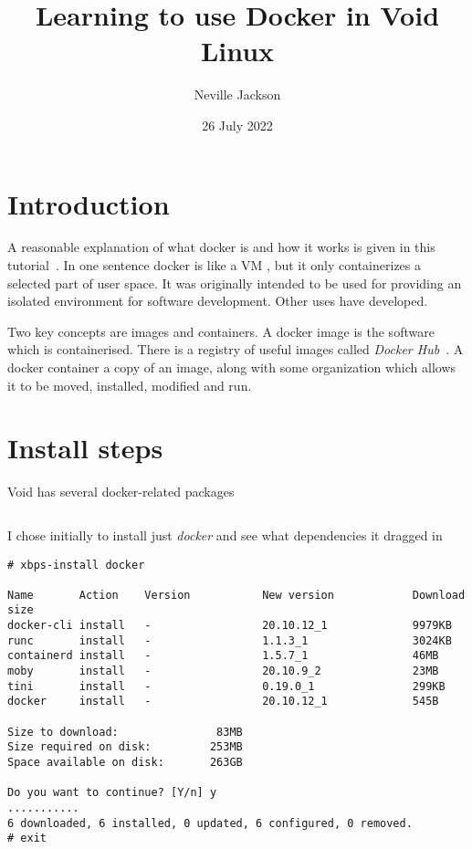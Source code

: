 \documentclass{article}  %
\title{Learning to use Docker in Void Linux}
\author{Neville Jackson}
\date{26 July 2022}
\begin{document}
 

\maketitle      

\section{Introduction} 
A reasonable explanation of what docker is and how it works is given in this tutorial~\cite{dock:00}. In one sentence docker is like a VM , but it only containerizes a selected part of user space. It was originally intended to be used for providing an isolated environment for software development. Other uses have developed. 

Two key concepts are images and containers. A docker image is the software which is containerised. There is a registry of useful images called {\em Docker Hub}~\cite{dock:02}. A docker container  a copy of an image, along with some organization which  allows it to be moved, installed, modified and run.

\section{Install steps}
\label{sec:install}
Void has several docker-related packages
\begin{verbatim}
\end{verbatim}
I chose initially to install just {\em docker} and see what dependencies it dragged in
\begin{verbatim}
# xbps-install docker

Name       Action    Version           New version            Download size
docker-cli install   -                 20.10.12_1             9979KB 
runc       install   -                 1.1.3_1                3024KB 
containerd install   -                 1.5.7_1                46MB 
moby       install   -                 20.10.9_2              23MB 
tini       install   -                 0.19.0_1               299KB 
docker     install   -                 20.10.12_1             545B 

Size to download:               83MB
Size required on disk:         253MB
Space available on disk:       263GB

Do you want to continue? [Y/n] y
...........
6 downloaded, 6 installed, 0 updated, 6 configured, 0 removed.
# exit

\end{verbatim}
\end{document}
